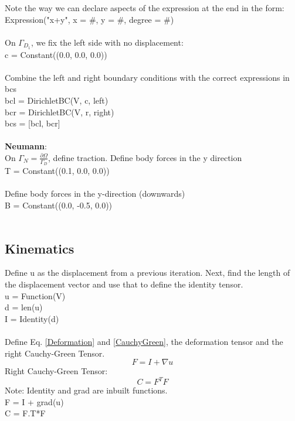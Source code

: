 \documentclass[12pt,3p]{article}
\begin{document}
Note the way we can declare aspects of the expression at the end in the form: \\
{\selectfont 
Expression("x+y", x = \#, y = \#, degree = \#) \\ \\
} 
On $\Gamma_{D_1}$, we fix the left side with no displacement: \\
{\selectfont
c = Constant((0.0, 0.0, 0.0)) \\ \\
}
Combine the left and right boundary conditions with the correct expressions in {\selectfont bcs } \\ 
{\selectfont
bcl = DirichletBC(V, c, left) \\
bcr = DirichletBC(V, r, right) \\
bcs = [bcl, bcr] \\ \\ 
}
\textbf{Neumann}: \\
On $\Gamma_N = \frac{\partial \Omega}{\Gamma_D}$, define traction. Define body forces in the y direction \\
{\selectfont
T  = Constant((0.1,  0.0, 0.0)) \\ \\
}
Define body forces in the y-direction (downwards) \\
{\selectfont
B  = Constant((0.0,  -0.5, 0.0))  \\ \\
}

\subsection{Kinematics}
Define u as the displacement from a previous iteration. Next, find the length of the displacement vector and use that to define the identity tensor. \\
{\selectfont
u  = Function(V) \\
d = len(u)          \\
I = Identity(d)     \\ \\ 
}
Define Eq. \ref{Deformation} and \ref{CauchyGreen}, the deformation tensor and the right Cauchy-Green Tensor. 
\begin{equation}\label{Deformation}
F = I + \nabla u
\end{equation}
Right Cauchy-Green Tensor:
\begin{equation}\label{CauchyGreen}
C = F^T F
\end{equation}
Note: {\selectfont Identity} and {\selectfont grad} are inbuilt functions. \\
{\selectfont
F = I + grad(u)    \\
C = F.T*F 
}
\end{document}
